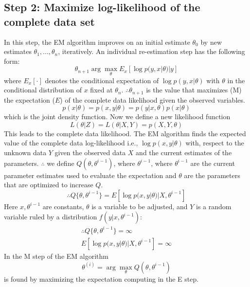 \documentclass[11pt]{article}
\begin{document}
\subsection{Step 2: Maximize log-likelihood of the complete data set}
In this step, the EM algorithm improves on an initial estimate $\theta_0$ by new estimates $\theta_1 , ..., \theta_n$, iteratively.  An individual re-estimation step has the following form: 
\begin{equation}
	\theta_{n+1} \arg \max_{\theta} E_x [ \log p(y, x | \theta) | y] 
\end{equation}
where $E_x[\cdot]$ denotes the conditional expectation of $\log p(y,x | \theta)$ with $\theta$ in the conditional distribution of $x$ fixed at $\theta_n$.  
$\therefore \theta_{n+1}$ is the value that maximizes (M) the expectation ($E$) of the complete data likelihood given the observed variables.  
\begin{equation}
p(x | \theta) = p(x,y | \theta) = p(y | x , \theta) p(x | \theta) 
\end{equation}
which is the joint density function.  Now we define a new likelihood function 
\begin{equation}
L ( \theta | Z) = L(\theta | X,Y)  = p(X,Y, \theta)
\end{equation}
This leads to the complete data likelihood.  The EM algorithm finds the expected value of the complete data log-likelihood i.e., $\log p(x, y | \theta)$ with, respect to the unknown data $Y$ given the observed data $X$ and the current estimates of the parameters.  $\therefore$ we define $Q(\theta, \theta^{i-1})$, where $\theta^{i-1}$,  where $\theta^{i-1}$ are the current parameter estimates used to evaluate the expectation and $\theta$ are the parameters that are optimized to increase $Q$.  
\begin{equation}
\therefore Q \{ \theta , \theta^ {i-1}\} = E [ \log p(x,y| \theta) | X , \theta^{i-1}]
\end{equation}
Here $x, \theta^{i-1}$ are constants, $\theta$ is a variable to be adjusted, and $Y$ is a random variable ruled by a distribution $f(y| x , \theta^{i-1})$:
\begin{eqnarray}
\therefore Q\{ \theta , \theta ^{i-1}\} = \infty \\
E[\log p(x,y| \theta) | X , \theta ^{i-1}] = \infty
\end{eqnarray}
In the M step of the EM algorithm 
\begin{equation}
\theta^{(i)} = \arg\max_{\theta} Q(\theta , \theta^{i-1})
\end{equation}
is found by maximizing the expectation computing in the E step.  
\end{document}
